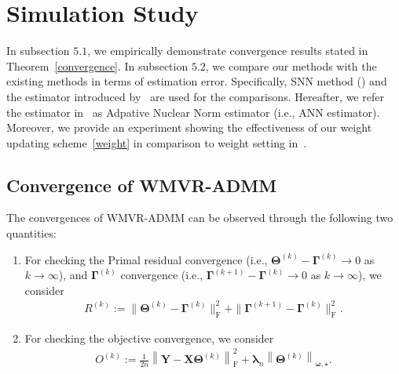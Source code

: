 \documentclass[alpha-refs]{wiley-article}
\begin{document}
\section{Simulation Study} \label{SC5}
In subsection $5.1$, we empirically demonstrate convergence results stated in Theorem~\ref{convergence}.
In subsection $5.2$, we compare our methods with the existing methods in terms of estimation error.
Specifically, SNN method (\citet{yuan2007dimension}) and the estimator introduced by~\citet{chen2013reduced} are used for the comparisons.
Hereafter, we refer the estimator in~\citet{chen2013reduced} as Adpative Nuclear Norm estimator (i.e., ANN estimator).
Moreover, we provide an experiment showing the effectiveness of our weight updating scheme~\eqref{weight} in comparison to weight setting in~\citet{chen2013reduced}.

\subsection{Convergence of WMVR-ADMM} \label{conv_exp}
The convergences of WMVR-ADMM can be observed through the following two quantities:
\begin{enumerate}
    \item For checking the Primal residual convergence (i.e., $\boldsymbol{\Theta}^{(k)}-\boldsymbol{\Gamma}^{(k)}\rightarrow{0}$ as $k\rightarrow{\infty}$),
    and $\boldsymbol{\Gamma}^{(k)}$ convergence (i.e., $\boldsymbol{\Gamma}^{(k+1)}-\boldsymbol{\Gamma}^{(k)}\rightarrow{0}$ as $k\rightarrow{\infty}$), we consider
    \begin{align*}
        R^{(k)} := \| \boldsymbol{\Theta}^{(k)}-\boldsymbol{\Gamma}^{(k)} \|_{\text{F}}^{2} +
        \| \boldsymbol{\Gamma}^{(k+1)}-\boldsymbol{\Gamma}^{(k)} \|_{\text{F}}^{2}.
    \end{align*}
    \item For checking the objective convergence, we consider
    \begin{align*}
        O^{(k)} :=  \frac{1}{2n} \left\| \boldsymbol{Y}-\boldsymbol{X}\boldsymbol{\Theta}^{(k)} \right\|_{\text{F}}^{2} + \boldsymbol{\lambda}_{n} \left\| \boldsymbol{\Theta}^{(k)}\right\|_{\boldsymbol{\omega,\star}} .
    \end{align*}
\end{enumerate}
\end{document}
